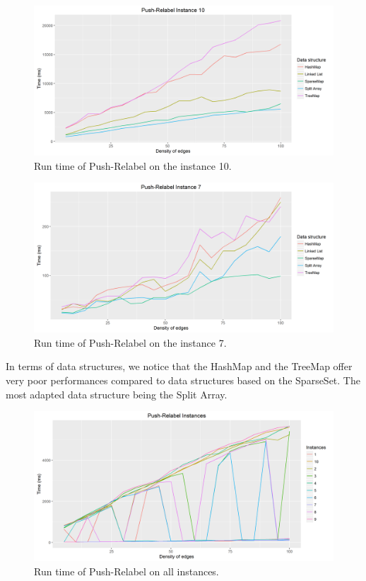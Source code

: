 \begin{figure}[H]
\includegraphics[scale=0.5]{images/PR10.png}
\caption{Run time of Push-Relabel on the instance 10.}
\label{fig:PR10}
\end{figure}
\begin{figure}[H]
\includegraphics[scale=0.5]{images/PR7.png}
\caption{Run time of Push-Relabel on the instance 7.}
\label{fig:PR7}
\end{figure}

In terms of data structures, we notice that the HashMap and the TreeMap offer very poor performances compared to data structures based on the SparseSet. The most adapted data structure being the Split Array.

\begin{figure}[H]
\includegraphics[scale=0.5]{images/PRmean.png}
\caption{Run time of Push-Relabel on all instances.}
\label{fig:PRmean}
\end{figure}

